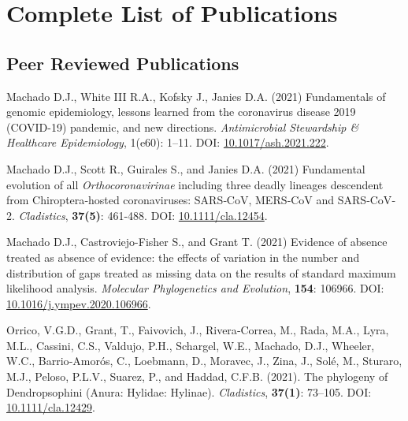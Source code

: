 
\section{Complete List of Publications}

\subsection{Peer Reviewed Publications}

	{
		\setlength{\parskip}{.5em}\renewcommand{\baselinestretch}{2.0}
		\begin{hangparas}{.25in}{1}


		Machado D.J., White III R.A., Kofsky J., Janies D.A. (2021) Fundamentals of genomic epidemiology, lessons learned from the coronavirus disease 2019 (COVID-19) pandemic, and new directions. \textit{Antimicrobial Stewardship \& Healthcare Epidemiology}, 1(e60): 1--11. DOI: \href{https://doi.org/10.1017/ash.2021.222}{10.1017/ash.2021.222}.
		
		Machado D.J., Scott R., Guirales S., and Janies D.A. (2021) Fundamental evolution of all \emph{Orthocoronavirinae} including three deadly lineages descendent from Chiroptera‐hosted coronaviruses: SARS‐CoV, MERS‐CoV and SARS‐CoV‐2. \emph{Cladistics}, \textbf{37(5)}: 461-488. DOI: \href{https://doi.org/10.1111/cla.12454}{10.1111/cla.12454}.

		Machado D.J., Castroviejo-Fisher S., and Grant T. (2021) Evidence of absence treated as absence of evidence: the effects of variation in the number and distribution of gaps treated as missing data on the results of standard maximum likelihood analysis. \emph{Molecular Phylogenetics and Evolution}, \textbf{154}: 106966. DOI: \href{https://doi.org/10.1016/j.ympev.2020.106966}{10.1016/j.ympev.2020.106966}.

        Orrico, V.G.D., Grant, T., Faivovich, J., Rivera‐Correa, M., Rada, M.A., Lyra, M.L., Cassini, C.S., Valdujo, P.H., Schargel, W.E., Machado, D.J., Wheeler, W.C., Barrio‐Amorós, C., Loebmann, D., Moravec, J., Zina, J., Solé, M., Sturaro, M.J., Peloso, P.L.V., Suarez, P., and Haddad, C.F.B. (2021). The phylogeny of Dendropsophini (Anura: Hylidae: Hylinae). \emph{Cladistics}, \textbf{37(1)}: 73–105. DOI: \href{https://doi.org/10.1111/cla.12429}{10.1111/cla.12429}.



\end{hangparas}}
